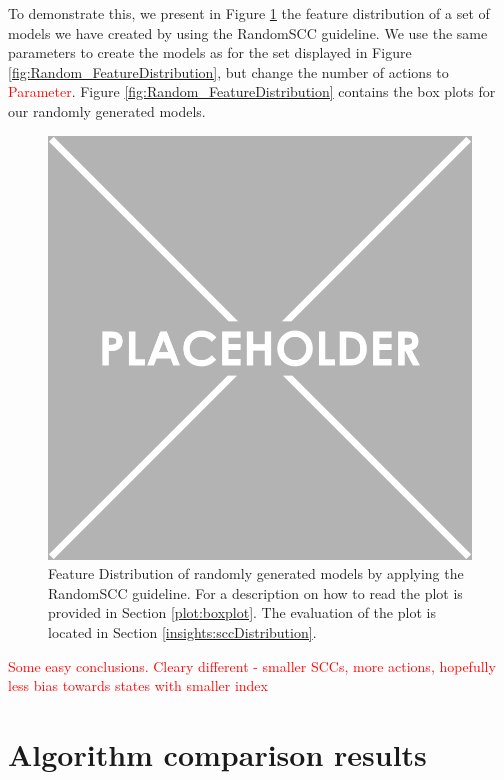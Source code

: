 To demonstrate this, we present in Figure \ref{fig:RandomSCC_FeatureDistributions} the feature distribution of a set of models we have created by using the RandomSCC guideline.
We use the same parameters to create the models as for the set displayed in Figure \ref{fig:Random_FeatureDistribution}, but change 
the number of actions to \textcolor{red}{Parameter}.
Figure \ref{fig:Random_FeatureDistribution} contains the box plots for our randomly generated models.
\begin{figure}[h!]
    \centering
    \includegraphics[width=1\textwidth]{figures/Placeholder.png}
    \caption[Feature Distribution of random models]{
        Feature Distribution of randomly generated models by applying the RandomSCC guideline. For a description on how to read the plot is provided in Section \ref{plot:boxplot}.
        The evaluation of the plot is located in Section \ref{insights:sccDistribution}.
    }
    \label{fig:RandomSCC_FeatureDistributions}
\end{figure}
\FloatBarrier

\label{insights:sccDistribution}
\textcolor{red}{Some easy conclusions. Cleary different - smaller SCCs, more actions, hopefully less bias towards states with smaller index}

\section{Algorithm comparison results}

